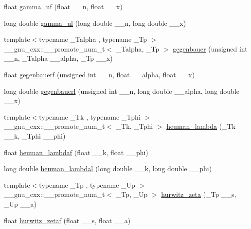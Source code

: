\begin{DoxyCompactItemize}
\item 
float \hyperlink{namespace____gnu__cxx_aed277602032a21acc09655467482eec9}{gamma\+\_\+uf} (float \+\_\+\+\_\+n, float \+\_\+\+\_\+x)
\item 
long double \hyperlink{namespace____gnu__cxx_ae2c9ff364ba758f0f41a5b71d2c9e755}{gamma\+\_\+ul} (long double \+\_\+\+\_\+n, long double \+\_\+\+\_\+x)
\item 
{\footnotesize template$<$typename \+\_\+\+Talpha , typename \+\_\+\+Tp $>$ }\\\+\_\+\+\_\+gnu\+\_\+cxx\+::\+\_\+\+\_\+promote\+\_\+num\+\_\+t$<$ \+\_\+\+Talpha, \+\_\+\+Tp $>$ \hyperlink{namespace____gnu__cxx_af295fecea6e26f1caeb7aa1560e9b7ee}{gegenbauer} (unsigned int \+\_\+\+\_\+n, \+\_\+\+Talpha \+\_\+\+\_\+alpha, \+\_\+\+Tp \+\_\+\+\_\+x)
\item 
float \hyperlink{namespace____gnu__cxx_a0f16dd9c771c8c177f377381b6e3387c}{gegenbauerf} (unsigned int \+\_\+\+\_\+n, float \+\_\+\+\_\+alpha, float \+\_\+\+\_\+x)
\item 
long double \hyperlink{namespace____gnu__cxx_abf1644841deefbb162ade9fa508591cb}{gegenbauerl} (unsigned int \+\_\+\+\_\+n, long double \+\_\+\+\_\+alpha, long double \+\_\+\+\_\+x)
\item 
{\footnotesize template$<$typename \+\_\+\+Tk , typename \+\_\+\+Tphi $>$ }\\\+\_\+\+\_\+gnu\+\_\+cxx\+::\+\_\+\+\_\+promote\+\_\+num\+\_\+t$<$ \+\_\+\+Tk, \+\_\+\+Tphi $>$ \hyperlink{namespace____gnu__cxx_a3b606d8617459ef7e5d340db1bae13ec}{heuman\+\_\+lambda} (\+\_\+\+Tk \+\_\+\+\_\+k, \+\_\+\+Tphi \+\_\+\+\_\+phi)
\item 
float \hyperlink{namespace____gnu__cxx_a10cf5d54d985aa3a58cb197601040ac8}{heuman\+\_\+lambdaf} (float \+\_\+\+\_\+k, float \+\_\+\+\_\+phi)
\item 
long double \hyperlink{namespace____gnu__cxx_adadaeb83b3d9c2fccd33ab8ec3188df5}{heuman\+\_\+lambdal} (long double \+\_\+\+\_\+k, long double \+\_\+\+\_\+phi)
\item 
{\footnotesize template$<$typename \+\_\+\+Tp , typename \+\_\+\+Up $>$ }\\\+\_\+\+\_\+gnu\+\_\+cxx\+::\+\_\+\+\_\+promote\+\_\+num\+\_\+t$<$ \+\_\+\+Tp, \+\_\+\+Up $>$ \hyperlink{namespace____gnu__cxx_aed8e8bb0f1755fa7b0786d02ed574347}{hurwitz\+\_\+zeta} (\+\_\+\+Tp \+\_\+\+\_\+s, \+\_\+\+Up \+\_\+\+\_\+a)
\item 
float \hyperlink{namespace____gnu__cxx_aa745d7f2edde060ed2f22817ad89df1f}{hurwitz\+\_\+zetaf} (float \+\_\+\+\_\+s, float \+\_\+\+\_\+a)

\end{DoxyCompactItemize}
